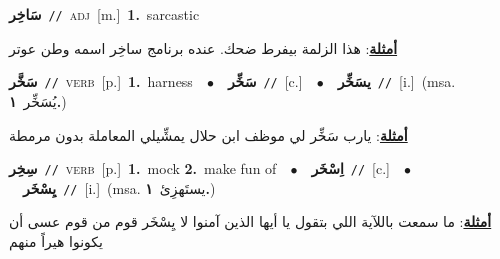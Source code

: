 \documentclass[10pt,a4paper,twoside]{article} %
\begin{document}
\begin{multicols}{2}
{\setlength\topsep{0pt}\textbf{\foreignlanguage{arabic}{سَاخِر}}\ {\color{gray}\texttt{//}\color{black}}\ \textsc{adj}\ [m.]\ \textbf{1.}~sarcastic\  \begin{flushright}\color{gray}\foreignlanguage{arabic}{\textbf{\underline{\foreignlanguage{arabic}{أمثلة}}}: هذا الزلمة بيفرط ضحك. عنده برنامج ساخِر اسمه وطن عوتر}\end{flushright}\color{black}} \vspace{2mm}

{\setlength\topsep{0pt}\textbf{\foreignlanguage{arabic}{سَخَّر}}\ {\color{gray}\texttt{//}\color{black}}\ \textsc{verb}\ [p.]\ \textbf{1.}~harness\ \ $\bullet$\ \ \setlength\topsep{0pt}\textbf{\foreignlanguage{arabic}{سَخِّر}}\ {\color{gray}\texttt{//}\color{black}}\ [c.]\ \ $\bullet$\ \ \setlength\topsep{0pt}\textbf{\foreignlanguage{arabic}{يسَخِّر}}\ {\color{gray}\texttt{//}\color{black}}\ [i.]\ \color{gray}(msa. \foreignlanguage{arabic}{يُسَخِّر}~\foreignlanguage{arabic}{\textbf{١.}})\color{black}\  \begin{flushright}\color{gray}\foreignlanguage{arabic}{\textbf{\underline{\foreignlanguage{arabic}{أمثلة}}}: يارب سَخِّر لي موظف ابن حلال يمشِّيلي المعاملة بدون مرمطة}\end{flushright}\color{black}} \vspace{2mm}

{\setlength\topsep{0pt}\textbf{\foreignlanguage{arabic}{سِخِر}}\ {\color{gray}\texttt{//}\color{black}}\ \textsc{verb}\ [p.]\ \textbf{1.}~mock  \textbf{2.}~make fun of\ \ $\bullet$\ \ \setlength\topsep{0pt}\textbf{\foreignlanguage{arabic}{اِسْخَر}}\ {\color{gray}\texttt{//}\color{black}}\ [c.]\ \ $\bullet$\ \ \setlength\topsep{0pt}\textbf{\foreignlanguage{arabic}{يِسْخَر}}\ {\color{gray}\texttt{//}\color{black}}\ [i.]\ \color{gray}(msa. \foreignlanguage{arabic}{يستَهزِئ}~\foreignlanguage{arabic}{\textbf{١.}})\color{black}\  \begin{flushright}\color{gray}\foreignlanguage{arabic}{\textbf{\underline{\foreignlanguage{arabic}{أمثلة}}}: ما سمعت باللآية اللي بتقول يا أيها الذين آمنوا لا يِسْخَر قوم من قوم عسى أن يكونوا هيراً منهم}\end{flushright}\color{black}} \vspace{2mm}


\end{multicols}
\end{document}
